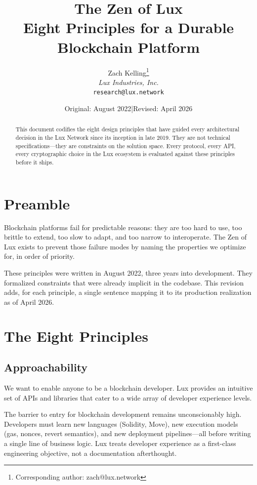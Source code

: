\documentclass[11pt,a4paper]{article}
\title{The Zen of Lux\\[4pt]
\large Eight Principles for a Durable Blockchain Platform}
\author{
Zach Kelling\thanks{Corresponding author: zach@lux.network}\\
\textit{Lux Industries, Inc.}\\
\texttt{research@lux.network}
}
\date{Original: August 2022\quad|\quad Revised: April 2026}
\begin{document}
\luxcoverpage

\begin{abstract}
This document codifies the eight design principles that have guided every
architectural decision in the Lux Network since its inception in late
2019. They are not technical specifications---they are constraints on
the solution space. Every protocol, every API, every cryptographic
choice in the Lux ecosystem is evaluated against these principles
before it ships.
\end{abstract}

\tableofcontents
\newpage

\section{Preamble}

Blockchain platforms fail for predictable reasons: they are too hard to
use, too brittle to extend, too slow to adapt, and too narrow to
interoperate. The Zen of Lux exists to prevent those failure modes by
naming the properties we optimize for, in order of priority.

These principles were written in August 2022, three years into
development. They formalized constraints that were already implicit
in the codebase. This revision adds, for each principle, a single
sentence mapping it to its production realization as of April 2026.

\section{The Eight Principles}

\subsection{Approachability}

We want to enable anyone to be a blockchain developer. Lux provides an
intuitive set of APIs and libraries that cater to a wide array of
developer experience levels.

The barrier to entry for blockchain development remains unconscionably
high. Developers must learn new languages (Solidity, Move), new
execution models (gas, nonces, revert semantics), and new deployment
pipelines---all before writing a single line of business logic. Lux
treats developer experience as a first-class engineering objective,
not a documentation afterthought.
\end{document}
